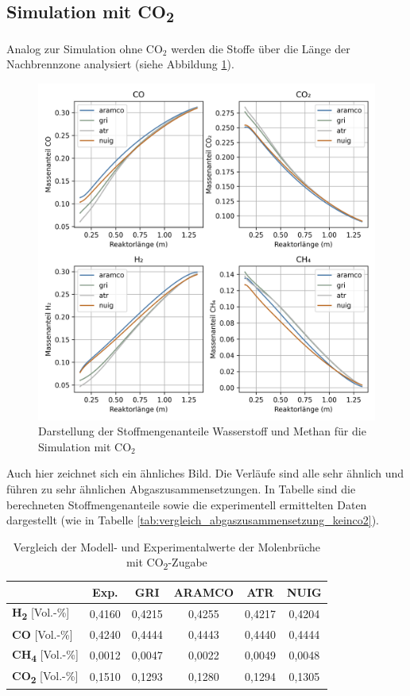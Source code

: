\documentclass[footmark=none]{tubaf-thesis}
\begin{document}
        \subsection{Simulation mit CO\textsubscript{2}}
        Analog zur Simulation ohne CO$_2$ werden die Stoffe über die Länge der Nachbrennzone analysiert (siehe Abbildung \ref{fig:vergleich_h2_ch4_co2}).
        \begin{figure}[H]
            \centering
            \includegraphics[width=0.8\linewidth]{img_py/H2_CH4_CO_CO2.png}
            \caption{Darstellung der Stoffmengenanteile Wasserstoff und Methan für die Simulation mit CO$_2$}
            \label{fig:vergleich_h2_ch4_co2}
        \end{figure}
        Auch hier zeichnet sich ein ähnliches Bild. Die Verläufe sind alle sehr ähnlich und führen zu sehr ähnlichen Abgaszusammensetzungen. In Tabelle sind die berechneten Stoffmengenanteile sowie die experimentell ermittelten Daten dargestellt (wie in Tabelle \ref{tab:vergleich_abgaszusammensetzung_keinco2}).
        \begin{table}[H]
            \centering
            \label{tab:vergleich_abgaszusammensetzung_co2}
            \caption{Vergleich der Modell- und Experimentalwerte der Molenbrüche mit CO\textsubscript{2}-Zugabe}
            \begin{tabular}{lccccc}
                \toprule
                & \textbf{Exp.} & \textbf{GRI} & \textbf{ARAMCO} & \textbf{ATR} & \textbf{NUIG} \\
                \midrule
                \textbf{H\textsubscript{2}} [Vol.-\%]   & 0{,}4160 & 0{,}4215 & 0{,}4255 & 0{,}4217 & 0{,}4204 \\
                \textbf{CO} [Vol.-\%]                  & 0{,}4240 & 0{,}4444 & 0{,}4443 & 0{,}4440 & 0{,}4444 \\
                \textbf{CH\textsubscript{4}} [Vol.-\%] & 0{,}0012 & 0{,}0047 & 0{,}0022 & 0{,}0049 & 0{,}0048 \\
                \textbf{CO\textsubscript{2}} [Vol.-\%] & 0{,}1510 & 0{,}1293 & 0{,}1280 & 0{,}1294 & 0{,}1305 \\
                \bottomrule
            \end{tabular}
        \end{table}
\end{document}
